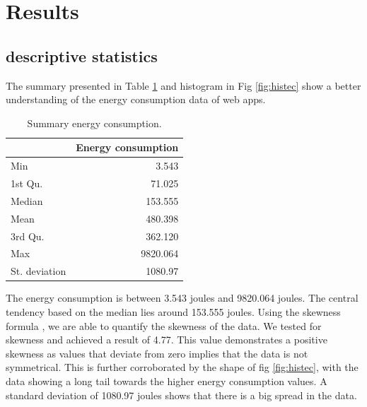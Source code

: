\section{Results} 
\subsection{descriptive statistics}
The summary presented in Table \ref{tab:table3} and histogram in Fig \ref{fig:histec} show a better understanding of the energy consumption data of web apps. 

\begin{table}[h!]
  \begin{center}
    \begin{tabular}{l|r} %
      \textbf{  } & \textbf{Energy consumption} \\
      \hline
      Min & 3.543\\
      1st Qu. & 71.025\\
      Median & 153.555\\
      Mean & 480.398 \\
      3rd Qu. & 362.120 \\
      Max & 9820.064 \\
      St. deviation & 1080.97\\
    \end{tabular}
        \caption{Summary energy consumption.}
           \label{tab:table3}
  \end{center}
\end{table}


The energy consumption is between 3.543 joules and 9820.064 joules. The central tendency based on the median lies around 153.555 joules. Using the skewness formula \cite{Rep:e1071}, we are able to quantify the skewness of the data. We tested for skewness and achieved a result of 4.77. This value demonstrates a positive skewness as values that deviate from zero implies that the data is not symmetrical. This is further corroborated by the shape of fig \ref{fig:histec}, with the data showing a long tail towards the higher energy consumption values. A standard deviation of 1080.97 joules shows that there is a big spread in the data. 

